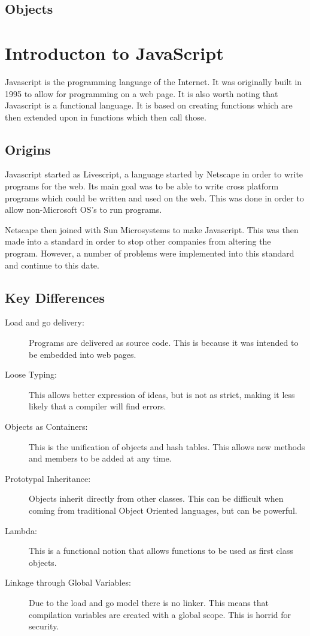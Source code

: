 		\subsection{Objects}
	\section{Introducton to JavaScript}
		Javascript is the programming language of the Internet. 
		It was originally built in 1995 to allow for programming on a web page. 
		It is also worth noting that Javascript is a functional language\cite{JSProgrammingLanguage}.
		It is based on creating functions which are then extended upon in functions which then call those. 

		\subsection{Origins}
		 
			Javascript started as Livescript, a language started by Netscape in order to write programs for the web. 
			Its main goal was to be able to write cross platform programs which could be written and used on the web. 
			This was done in order to allow non-Microsoft OS's to run programs. 

			Netscape then joined with Sun Microsystems to make Javascript. 
			This was then made into a standard in order to stop other companies from altering the program. 
			However, a number of problems were implemented into this standard and continue to this date. 
		\subsection{Key Differences}
			\begin{description}
				\item[Load and go delivery:] Programs are delivered as source code. 
					This is because it was intended to be embedded into web pages. 
				\item[Loose Typing:] This allows better expression of ideas,
					but is not as strict, making it less likely that a compiler will find errors. 
				\item[Objects as Containers:] This is the unification of objects and hash tables.
					This allows new methods and members to be added at any time. 
				\item[Prototypal Inheritance:] Objects inherit directly from other classes. 
					This can be difficult when coming from traditional Object Oriented languages, but can be powerful. 
				\item[Lambda:] This is a functional notion that allows functions to be used as first class objects. 
				\item[Linkage through Global Variables:] Due to the load and go model there is no linker. 
					This means that compilation variables are created with a global scope. 
					This is horrid for security. 
			\end{description}
